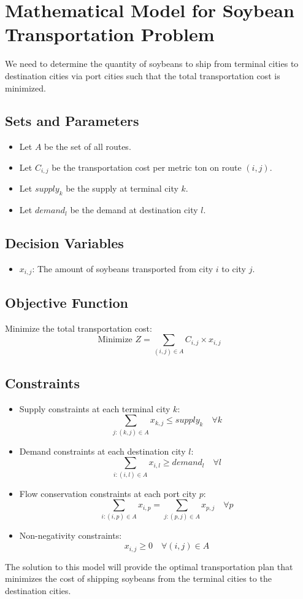 \documentclass{article}
\begin{document}
\section*{Mathematical Model for Soybean Transportation Problem}

We need to determine the quantity of soybeans to ship from terminal cities to destination cities via port cities such that the total transportation cost is minimized.

\subsection*{Sets and Parameters}

\begin{itemize}
    \item Let $A$ be the set of all routes.
    \item Let $C_{i,j}$ be the transportation cost per metric ton on route $(i, j)$.
    \item Let $supply_{k}$ be the supply at terminal city $k$.
    \item Let $demand_{l}$ be the demand at destination city $l$.
\end{itemize}

\subsection*{Decision Variables}

\begin{itemize}
    \item $x_{i,j}$: The amount of soybeans transported from city $i$ to city $j$.
\end{itemize}

\subsection*{Objective Function}

Minimize the total transportation cost:
\[
\text{Minimize } Z = \sum_{(i,j) \in A} C_{i,j} \times x_{i,j}
\]

\subsection*{Constraints}

\begin{itemize}
    \item Supply constraints at each terminal city $k$:
    \[
    \sum_{j : (k, j) \in A} x_{k,j} \leq supply_{k} \quad \forall k
    \]
    \item Demand constraints at each destination city $l$:
    \[
    \sum_{i : (i, l) \in A} x_{i,l} \geq demand_{l} \quad \forall l
    \]
    \item Flow conservation constraints at each port city $p$:
    \[
    \sum_{i : (i, p) \in A} x_{i,p} = \sum_{j : (p, j) \in A} x_{p,j} \quad \forall p
    \]
    \item Non-negativity constraints:
    \[
    x_{i,j} \geq 0 \quad \forall (i,j) \in A
    \]
\end{itemize}

The solution to this model will provide the optimal transportation plan that minimizes the cost of shipping soybeans from the terminal cities to the destination cities.
\end{document}
